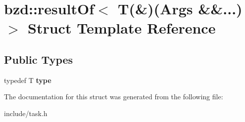 \hypertarget{structbzd_1_1resultOf_3_01T_07_6_08_07Args_01_6_6_8_8_8_08_4}{}\section{bzd\+:\+:result\+Of$<$ T(\&)(Args \&\&...)$>$ Struct Template Reference}
\label{structbzd_1_1resultOf_3_01T_07_6_08_07Args_01_6_6_8_8_8_08_4}
\subsection*{Public Types}
\begin{DoxyCompactItemize}
\item 
\mbox{\label{structbzd_1_1resultOf_3_01T_07_6_08_07Args_01_6_6_8_8_8_08_4_a8934d2a37aa8c8df195926397884d75b}} 
typedef T {\bfseries type}
\end{DoxyCompactItemize}


The documentation for this struct was generated from the following file\+:\begin{DoxyCompactItemize}
\item 
include/task.\+h\end{DoxyCompactItemize}
